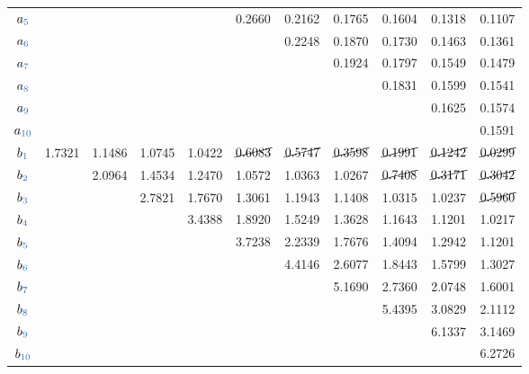 \begin{table}[htbp]
{\begin{tabular}{c|cccccccccc}
			$a_{\textcolor{NavyBlue}{5}}$  &        &        &        &        & 0.2660 & 0.2162 & 0.1765 & 0.1604 & 0.1318 & 0.1107 \\
			$a_{\textcolor{NavyBlue}{6}}$  &        &        &        &        &        & 0.2248 & 0.1870 & 0.1730 & 0.1463 & 0.1361 \\
			$a_{\textcolor{NavyBlue}{7}}$  &        &        &        &        &        &        & 0.1924 & 0.1797 & 0.1549 & 0.1479 \\
			$a_{\textcolor{NavyBlue}{8}}$  &        &        &        &        &        &        &        & 0.1831 & 0.1599 & 0.1541 \\
			$a_{\textcolor{NavyBlue}{9}}$  &        &        &        &        &        &        &        &        & 0.1625 & 0.1574 \\
			$a_{\textcolor{NavyBlue}{10}}$ &        &        &        &        &        &        &        &        &        & 0.1591 \\ \midrule[1.2pt]
			$b_{\textcolor{NavyBlue}{1}}$  & 1.7321 & 1.1486 & 1.0745 & 1.0422 & $\cancel{0.6083}$ & $\cancel{0.5747}$ & $\cancel{0.3598}$ & $\cancel{0.1991}$ & $\cancel{0.1242}$ & $\cancel{0.0299}$ \\
			$b_{\textcolor{NavyBlue}{2}}$  &        & 2.0964 & 1.4534 & 1.2470 & 1.0572 & 1.0363 & 1.0267 & $\cancel{0.7408}$ & $\cancel{0.3171}$ & $\cancel{0.3042}$ \\
			$b_{\textcolor{NavyBlue}{3}}$  &        &        & 2.7821 & 1.7670 & 1.3061 & 1.1943 & 1.1408 & 1.0315 & 1.0237 & $\cancel{0.5960}$ \\
			$b_{\textcolor{NavyBlue}{4}}$  &        &        &        & 3.4388 & 1.8920 & 1.5249 & 1.3628 & 1.1643 & 1.1201 & 1.0217 \\
			$b_{\textcolor{NavyBlue}{5}}$  &        &        &        &        & 3.7238 & 2.2339 & 1.7676 & 1.4094 & 1.2942 & 1.1201 \\
			$b_{\textcolor{NavyBlue}{6}}$  &        &        &        &        &        & 4.4146 & 2.6077 & 1.8443 & 1.5799 & 1.3027 \\
			$b_{\textcolor{NavyBlue}{7}}$  &        &        &        &        &        &        & 5.1690 & 2.7360 & 2.0748 & 1.6001 \\
			$b_{\textcolor{NavyBlue}{8}}$  &        &        &        &        &        &        &        & 5.4395 & 3.0829 & 2.1112 \\
			$b_{\textcolor{NavyBlue}{9}}$  &        &        &        &        &        &        &        &        & 6.1337 & 3.1469 \\
			$b_{\textcolor{NavyBlue}{10}}$ &        &        &        &        &        &        &        &        &        & 6.2726 \\ \bottomrule[2pt]
		\end{tabular}
	}
\end{table}

